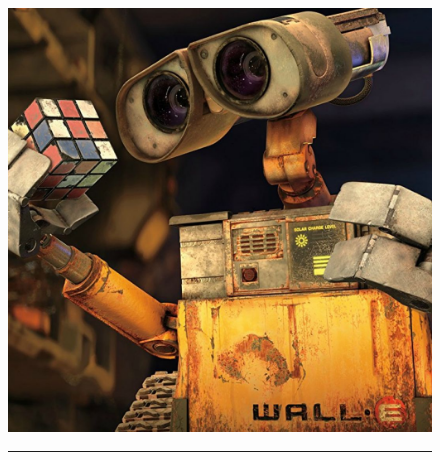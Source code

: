 \begin{figure}[H]
{{           \includegraphics[scale=0.111]{images/wall-e.jpg}\\
           \rule{0ex}{0.15in}%
        }
     \rule{1.4in}{0ex}}%
\end{figure}
